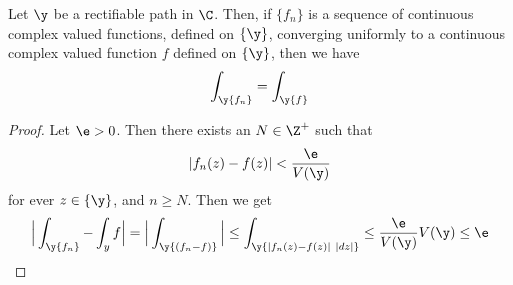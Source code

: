 \begin{lemma}\label{4.3.3}
    Let $\y$ be a rectifiable path in  $\C$. Then, if $\{f_n\}$ is a sequence of
    continuous complex valued functions, defined on $\{\y\}$, converging
    uniformly to a continuous complex valued function $f$ defined on $\{\y\}$,
    then we have
    \begin{equation*}
        \int_\y{f_n}=\int_\y{f}
    \end{equation*}
\end{lemma}
\begin{proof}
    Let $\e>0$. Then there exists an $N \in \Z^+$ such that
    \begin{equation*}
        |f_n(z)-f(z)|<\frac{\e}{V(\y)}
    \end{equation*}
    for ever $z \in \{\y\}$, and $n \geq N$. Then we get
    \begin{equation*}
        \Big{|} \int_\y{f_n}-\int_{y}{f} \Big{|}=
        \Big{|} \int_\y{(f_n-f)} \Big{|} \leq
        \int_\y{|f_n(z)-f(z)| \ |dz|} \leq \frac{\e}{V(\y)}V(\y) \leq \e
    \end{equation*}
\end{proof}

